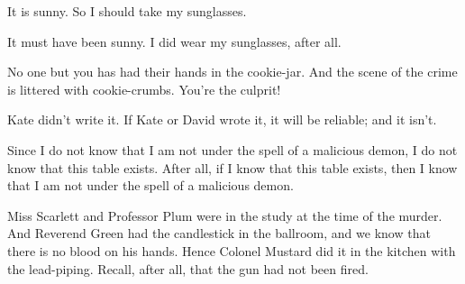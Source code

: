 \begin{practiceproblems}
\begin{problemslist}
	\item It is sunny. So I should take my sunglasses.
	\item It must have been sunny. I did wear my sunglasses, after all.
	\item No one but you has had their hands in the cookie-jar. And the scene of the crime is littered with cookie-crumbs. You're the culprit! 
	\item Kate didn't write it. If Kate or David wrote it, it will be reliable; and it isn’t.
	\item  Since I do not know that I am not under the spell of a malicious demon, I do not know that this table exists. After all, if I know that this table exists, then I know that I am not under the spell of a malicious demon.
	\item Miss Scarlett and Professor Plum were in the study at the time of the murder. And Reverend Green had the candlestick in the ballroom, and we know that there is no blood on his hands. Hence Colonel Mustard did it in the kitchen with the lead-piping. Recall, after all, that the gun had not been fired.

\end{problemslist}
\end{practiceproblems}
